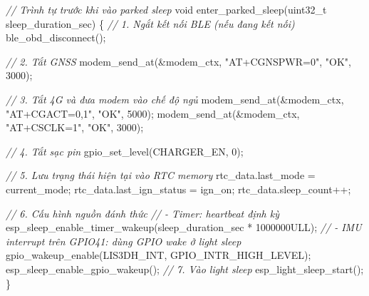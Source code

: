 \documentclass[a4paper]{extarticle}
\newenvironment{Shaded}{}{}
\newcommand{\BuiltInTok}[1]{\textcolor[rgb]{0.00,0.50,0.00}{#1}}
\newcommand{\CommentTok}[1]{\textcolor[rgb]{0.38,0.63,0.69}{\textit{#1}}}
\newcommand{\DataTypeTok}[1]{\textcolor[rgb]{0.56,0.13,0.00}{#1}}
\newcommand{\DecValTok}[1]{\textcolor[rgb]{0.25,0.63,0.44}{#1}}
\newcommand{\NormalTok}[1]{#1}
\newcommand{\OperatorTok}[1]{\textcolor[rgb]{0.40,0.40,0.40}{#1}}
\newcommand{\StringTok}[1]{\textcolor[rgb]{0.25,0.44,0.63}{#1}}
\begin{document}
\begin{Shaded}
\begin{Highlighting}[]
\CommentTok{// Trình tự trước khi vào parked sleep}
\DataTypeTok{void}\NormalTok{ enter\_parked\_sleep}\OperatorTok{(}\DataTypeTok{uint32\_t}\NormalTok{ sleep\_duration\_sec}\OperatorTok{)}
\OperatorTok{\{}
    \CommentTok{// 1. Ngắt kết nối BLE (nếu đang kết nối)}
\NormalTok{    ble\_obd\_disconnect}\OperatorTok{();}

    \CommentTok{// 2. Tắt GNSS}
\NormalTok{    modem\_send\_at}\OperatorTok{(\&}\NormalTok{modem\_ctx}\OperatorTok{,} \StringTok{"AT+CGNSPWR=0"}\OperatorTok{,} \StringTok{"OK"}\OperatorTok{,} \DecValTok{3000}\OperatorTok{);}

    \CommentTok{// 3. Tắt 4G và đưa modem vào chế độ ngủ}
\NormalTok{    modem\_send\_at}\OperatorTok{(\&}\NormalTok{modem\_ctx}\OperatorTok{,} \StringTok{"AT+CGACT=0,1"}\OperatorTok{,} \StringTok{"OK"}\OperatorTok{,} \DecValTok{5000}\OperatorTok{);}
\NormalTok{    modem\_send\_at}\OperatorTok{(\&}\NormalTok{modem\_ctx}\OperatorTok{,} \StringTok{"AT+CSCLK=1"}\OperatorTok{,} \StringTok{"OK"}\OperatorTok{,} \DecValTok{3000}\OperatorTok{);}

    \CommentTok{// 4. Tắt sạc pin}
\NormalTok{    gpio\_set\_level}\OperatorTok{(}\NormalTok{CHARGER\_EN}\OperatorTok{,} \DecValTok{0}\OperatorTok{);}

    \CommentTok{// 5. Lưu trạng thái hiện tại vào RTC memory}
\NormalTok{    rtc\_data}\OperatorTok{.}\NormalTok{last\_mode       }\OperatorTok{=}\NormalTok{ current\_mode}\OperatorTok{;}
\NormalTok{    rtc\_data}\OperatorTok{.}\NormalTok{last\_ign\_status }\OperatorTok{=}\NormalTok{ ign\_on}\OperatorTok{;}
\NormalTok{    rtc\_data}\OperatorTok{.}\NormalTok{sleep\_count}\OperatorTok{++;}

    \CommentTok{// 6. Cấu hình nguồn đánh thức}
    \CommentTok{//    {-} Timer: heartbeat định kỳ}
\NormalTok{    esp\_sleep\_enable\_timer\_wakeup}\OperatorTok{(}\NormalTok{sleep\_duration\_sec }\OperatorTok{*} \DecValTok{1000000}\BuiltInTok{ULL}\OperatorTok{);}
    \CommentTok{//    {-} IMU interrupt trên GPIO41: dùng GPIO wake ở light sleep}
\NormalTok{    gpio\_wakeup\_enable}\OperatorTok{(}\NormalTok{LIS3DH\_INT}\OperatorTok{,}\NormalTok{ GPIO\_INTR\_HIGH\_LEVEL}\OperatorTok{);}
\NormalTok{    esp\_sleep\_enable\_gpio\_wakeup}\OperatorTok{();}
    \CommentTok{// 7. Vào light sleep}
\NormalTok{    esp\_light\_sleep\_start}\OperatorTok{();}
\OperatorTok{\}}
\end{Highlighting}
\end{Shaded}
\end{document}
